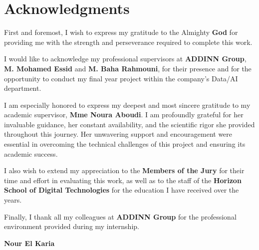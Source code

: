 \chapter*{Acknowledgments}

\vspace{1cm}

First and foremost, I wish to express my gratitude to the Almighty \textbf{God} for providing me with the strength and perseverance required to complete this work.

I would like to acknowledge my professional supervisors at \textbf{ADDINN Group}, \textbf{M. Mohamed Essid} and \textbf{M. Baha Rahmouni}, for their presence and for the opportunity to conduct my final year project within the company's Data/AI department.

I am especially honored to express my deepest and most sincere gratitude to my academic supervisor, \textbf{Mme Noura Aboudi}. I am profoundly grateful for her invaluable guidance, her constant availability, and the scientific rigor she provided throughout this journey. Her unwavering support and encouragement were essential in overcoming the technical challenges of this project and ensuring its academic success.

I also wish to extend my appreciation to the \textbf{Members of the Jury} for their time and effort in evaluating this work, as well as to the staff of the \textbf{Horizon School of Digital Technologies} for the education I have received over the years.

Finally, I thank all my colleagues at \textbf{ADDINN Group} for the professional environment provided during my internship.

\vspace{1cm}

\begin{flushright}
	\textbf{Nour El Karia}
\end{flushright}